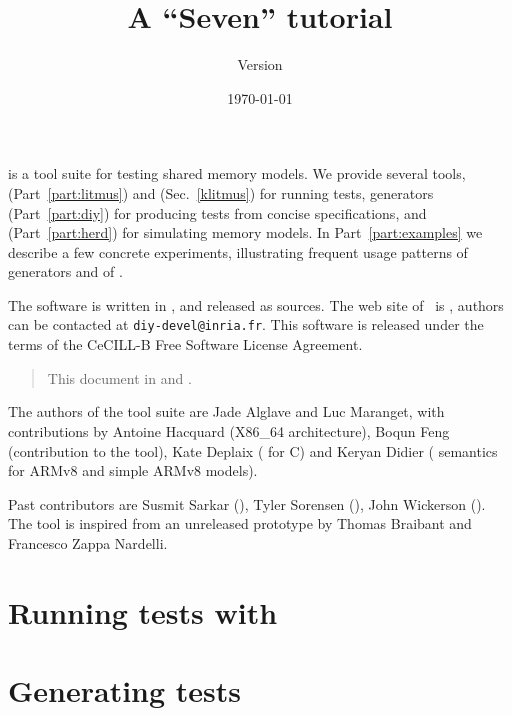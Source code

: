 \documentclass{article}
\title{A \prog{diy} ``Seven'' tutorial}
\author{Version \version}
\date{\today}
\begin{document}
\maketitle

\diy{} is a tool suite for testing shared memory models.  We
provide several tools, \litmus{} (Part~\ref{part:litmus})
and \klitmus{} (Sec.~\ref{klitmus}) for running tests,
\diy{} generators (Part~\ref{part:diy}) for producing tests from concise
specifications, and
\herd{} (Part~\ref{part:herd}) for simulating memory models.
In Part~\ref{part:examples} we describe
a few concrete experiments, illustrating frequent usage patterns of
\diy{} generators and of \litmus.


The software is written in
, and released as
sources.  The web site of~\diy{} is
, authors can be contacted at
\texttt{diy-devel@inria.fr}.
This software is released under the terms of the CeCILL-B Free Software License
Agreement.



\begin{htmlonly}
\begin{quote}
This document in  and .
\end{quote}
\end{htmlonly}

The authors of the \diy{} tool suite are Jade Alglave and Luc Maranget,
with contributions
by Antoine Hacquard (X86\_64 architecture),
Boqun Feng (contribution to the  tool),
Kate Deplaix (\litmus{} for C) and
Keryan Didier (\herd{} semantics for ARMv8 and simple ARMv8 models).

Past contributors are Susmit Sarkar (),
Tyler Sorensen (), John Wickerson ().
The tool  is inspired from an unreleased prototype by
Thomas Braibant and Francesco Zappa Nardelli.

\tableofcontents
\cutend

\clearpage
\part{Running\label{part:litmus} tests with \litmus}


\clearpage
\part{Generating\label{part:diy} tests}

\end{document}

